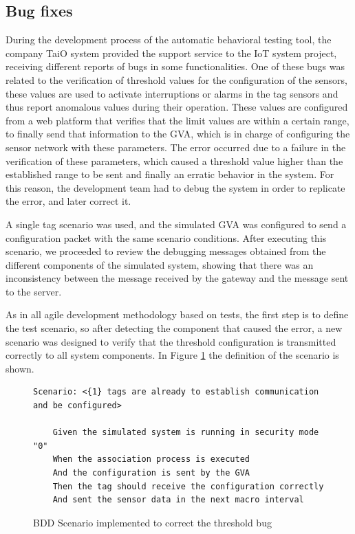 \documentclass[journal]{IEEEtran}	%
\begin{document}
\subsection{Bug fixes}

During the development process of the automatic behavioral testing tool, the company TaiO system provided the support service to the IoT system project, receiving different reports of bugs in some functionalities. One of these bugs was related to the verification of threshold values for the configuration of the sensors, these values are used to activate interruptions or alarms in the tag sensors and thus report anomalous values during their operation. These values are configured from a web platform that verifies that the limit values are within a certain range, to finally send that information to the GVA, which is in charge of configuring the sensor network with these parameters. The error occurred due to a failure in the verification of these parameters, which caused a threshold value higher than the established range to be sent and finally an erratic behavior in the system. For this reason, the development team had to debug the system in order to replicate the error, and later correct it.

A single tag scenario was used, and the simulated GVA was configured to send a configuration packet with the same scenario conditions. After executing this scenario, we proceeded to review the debugging messages obtained from the different components of the simulated system, showing that there was an inconsistency between the message received by the gateway and the message sent to the server.

As in all agile development methodology based on tests, the first step is to define the test scenario, so after detecting the component that caused the error, a new scenario was designed to verify that the threshold configuration is transmitted correctly to all system components. In Figure \ref{fig:bddBug} the definition of the scenario is shown.

\begin{figure}[t]
\centering
\begin{lstlisting}[style=scenarioStyle]
Scenario: <{1} tags are already to establish communication and be configured>
    
    Given the simulated system is running in security mode "0"
    When the association process is executed
    And the configuration is sent by the GVA
    Then the tag should receive the configuration correctly
    And sent the sensor data in the next macro interval
\end{lstlisting}
\caption{BDD Scenario implemented to correct the threshold bug}
\label{fig:bddBug}
\end{figure}
\end{document}
